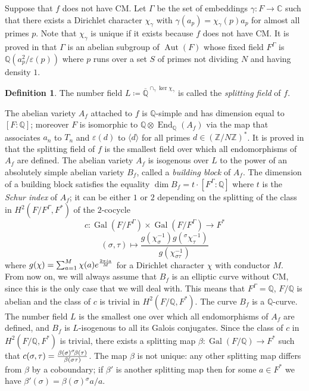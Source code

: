 \documentclass[11pt]{amsart}
\theoremstyle{definition}
\newtheorem{definizione}{Definition}[section]
\begin{document}
        Suppose that $f$ does not have CM. Let $\Gamma$ be the set of embeddings $\gamma \colon F \to {\mathbb{C}}$ such that 
  		there exists a Dirichlet character $\chi_{\gamma}$ with $\gamma(a_p)=\chi_{\gamma}(p)a_p$ for almost all primes $p$. Note 
  		that $\chi_{\gamma}$ is unique if it exists because $f$ does not have CM. It is proved in \cite{rib2} that $\Gamma$ is an abelian 
  		subgroup of $\operatorname{Aut}(F)$ whose fixed field $F^{\Gamma}$ is ${\mathbb{Q}}(a_p^2/\varepsilon(p))$ where $p$ runs over a set $S$ of primes 
  		not dividing $N$ and having density $1$.
			\begin{definizione}
    			The number field $L\coloneqq {\overline{\mathbb{Q}}}^{\cap_{\gamma}\ker\chi_\gamma}$ is called the \emph{splitting field} of $f$.
		\end{definizione}
  		The abelian variety $A_f$ attached to $f$ is ${\mathbb{Q}}$-simple and has dimension equal to $[F\colon {\mathbb{Q}}]$; moreover $F$ is isomorphic to ${\mathbb{Q}}\otimes\operatorname{End}_{\mathbb{Q}}(A_f)$ via the map that associates $a_n$ to $T_n$ and $\varepsilon(d)$ to $\langle d \rangle$ for all primes $d\in ({\mathbb{Z}}/N{\mathbb{Z}})^*$. It is proved in \cite{gola} that the splitting field of $f$ is the smallest field over which all endomorphisms of $A_f$ are defined. The abelian variety $A_f$ is isogenous over $L$ to the power of an absolutely simple abelian variety $B_f$, called a \emph{building block} of $A_f$. The dimension of a building block satisfies the equality $\dim B_f=t\cdot [F^{\Gamma}\colon{\mathbb{Q}}]$ where $t$ is the \emph{Schur index} of $A_f$; it can be either $1$ or $2$ depending on the splitting of the class in $H^2(F/F^{\Gamma},F^*)$ of the $2$-cocycle
		$$c\colon \operatorname{Gal}(F/F^{\Gamma})\times\operatorname{Gal}(F/F^{\Gamma})\to F^*$$
  		$$(\sigma,\tau)\mapsto \frac{g(\chi_{\sigma}^{-1})g({{}^\sigma\!}\chi_{\tau}^{-1})}{g(\chi_{\sigma\tau}^{-1})}$$
  		where ${\displaystyle} g(\chi)=\sum_{a=1}^M\chi(a)e^{\frac{2\pi ia}{M}}$ for a Dirichlet character $\chi$ with conductor $M$.
  		From now on, we will always assume that $B_f$ is an elliptic curve without CM, since this is the only case that we will deal with. This means that $F^{\Gamma}={\mathbb{Q}}$, $F/{\mathbb{Q}}$ is abelian and the class of $c$ is trivial in $H^2(F/{\mathbb{Q}},F^*)$. The curve $B_f$ is a ${\mathbb{Q}}$-curve. The number field $L$ is the smallest one over which all endomorphisms of $A_f$ are defined, and $B_f$ is $L$-isogenous to all its Galois conjugates.
  		Since the class of $c$ in $H^2(F/{\mathbb{Q}},F^*)$ is trivial, there exists a splitting map $\beta \colon \operatorname{Gal}(F/{\mathbb{Q}})\to F^*$ such that ${\displaystyle} c(\sigma,\tau)=\frac{\beta(\sigma){{}^\sigma\!}\beta(\tau)}{\beta(\sigma\tau)}$. The map $\beta$ is not unique: any other splitting map differs from $\beta$ by a coboundary; if $\beta'$ is another splitting map then for some $a \in F^*$ we have $\beta'(\sigma)=\beta(\sigma){{}^\sigma\!} a/a$.
\end{document}
